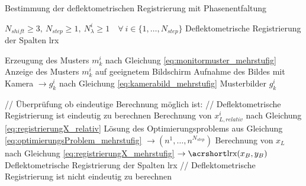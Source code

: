 \begin{algorithm}[H]
\caption{Bestimmung der deflektometrischen Registrierung mit Phasenentfaltung}
	\label{alg:bestimmungDeflektometrischeRegistrierung}
	\begin{algorithmic}[1]
		\Require $N_{shift} \geq 3, ~N_{step} \geq 1, ~N_\lambda^i \geq 1 \quad\forall ~i \in \lbrace 1,\ldots,N_{step} \rbrace$
		\Ensure Deflektometrische Registrierung der Spalten \acrshort{lrx}
		
		\Statex		
		
					\State Erzeugung des Musters $m_k^i$ nach Gleichung \ref{eq:monitormuster_mehrstufig}
					\State Anzeige des Musters $m_k^i$ auf geeignetem Bildschirm
					\State Aufnahme des Bildes mit Kamera $\rightarrow g_k^i$ nach Gleichung \ref{eq:kamerabild_mehrstufig}
				\EndFor
			\EndFor
			\State \Return Musterbilder $g_k^i$
		\EndProcedure
		
		\Statex
		
			\State // Überprüfung ob eindeutige Berechnung möglich ist:
				\State // Deflektometrische Registrierung ist eindeutig zu berechnen
						\State Berechnung von $x_{L,relativ}^i$ nach Gleichung \ref{eq:registrierungX_relativ}
					\EndFor
					\State Lösung des Optimierungsproblems aus Gleichung \ref{eq:optimierungsProblem_mehrstufig} $\rightarrow (n^1,\ldots, n^{N_{step}})$
					\State Berechnung von $x_L$ nach Gleichung \ref{eq:registrierungX_mehrstufig} $\rightarrow \acrshortmath{lrx}(x_B, y_B)$
				\EndFor
				\State \Return Deflektometrische Registrierung der Spalten \acrshort{lrx}
			\Else
				\State // Deflektometrische Registrierung ist nicht eindeutig zu berechnen
				\State \Return
			\EndIf
		\EndProcedure
	\end{algorithmic}
\end{algorithm}